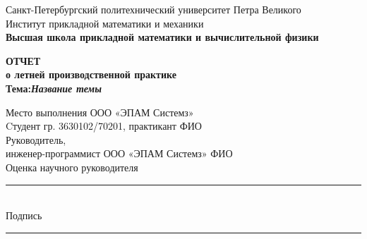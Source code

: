 \documentclass[main.tex]{subfiles}
\begin{document}
\begin{titlepage}
\begin{center}
	\begin{large}
		Санкт-Петербургский политехнический университет Петра Великого\\
		Институт прикладной математики и механики\\
		\textbf{Высшая школа прикладной математики и вычислительной физики}\\
		\hrulefill
	\end{large}
	\vfill
	\Large{\textbf{ОТЧЕТ\\ о летней производственной практике}\\
	\vspace{5mm}\textbf{Тема:\hspace{2mm}\textit{Название темы}}
	}
\end{center}
\vfill
Место выполнения \hfill{ООО «ЭПАМ Системз»}\\
\newline
Cтудент гр. 3630102/70201, практикант \hfill{ФИО} \\
\newline
Руководитель, \\
инженер-программист ООО «ЭПАМ Системз» \hfill{ФИО}\\
\newline
Оценка научного руководителя\hfill{\rule{3.5cm}{0.5pt}}\\
\newline
Подпись\hfill{\rule{3.5cm}{0.5pt}\vspace{5mm}}
\vfill
{}



\end{titlepage}
\end{document}
